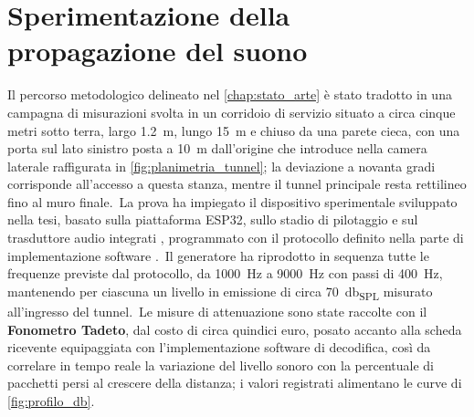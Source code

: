 \chapter{Sperimentazione della propagazione del suono}
\label{chap:sperimentazione_propagazione}

Il percorso metodologico delineato nel \autoref{chap:stato_arte} è stato tradotto in una campagna di misurazioni svolta in un corridoio di servizio situato a circa cinque metri sotto terra, largo \SI{1.2}{\meter}, lungo \SI{15}{\meter} e chiuso da una parete cieca, con una porta sul lato sinistro posta a \SI{10}{\meter} dall'origine che introduce nella camera laterale raffigurata in \autoref{fig:planimetria_tunnel}; la deviazione a novanta gradi corrisponde all'accesso a questa stanza, mentre il tunnel principale resta rettilineo fino al muro finale.\ La prova ha impiegato il dispositivo sperimentale sviluppato nella tesi, basato sulla piattaforma ESP32, sullo stadio di pilotaggio e sul trasduttore audio integrati \cite{Espressif2024,esp32techref,adafruit-guide}, programmato con il protocollo definito nella parte di implementazione software \cite{QuadraticInterpolationSpectralPeaks}.\ Il generatore ha riprodotto in sequenza tutte le frequenze previste dal protocollo, da \SI{1000}{\hertz} a \SI{9000}{\hertz} con passi di \SI{400}{\hertz}, mantenendo per ciascuna un livello in emissione di circa \SI{70}{\decibel_{SPL}} misurato all'ingresso del tunnel.\ Le misure di attenuazione sono state raccolte con il \textbf{Fonometro Tadeto}, dal costo di circa quindici euro, posato accanto alla scheda ricevente equipaggiata con l'implementazione software di decodifica, così da correlare in tempo reale la variazione del livello sonoro con la percentuale di pacchetti persi al crescere della distanza; i valori registrati alimentano le curve di \autoref{fig:profilo_db}.

